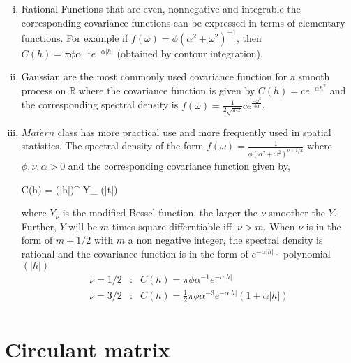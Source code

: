 \begin{enumerate}[(i)]
	\item Rational Functions that are even,  nonnegative and integrable the corresponding covariance functions can be expressed in terms of elementary functions. For example if $f(\omega) =\phi (\alpha^2+\omega^2)^{-1}$, then $C(h) = \pi\phi\alpha^{-1}e^{-\alpha|h|}$ (obtained by contour integration).
	      
	\item Gaussian are the most commonly used covariance function for a smooth process on $\mathbb{R}$ where the covariance function is given by $C(h)=ce^{-\alpha h^2}$ and the corresponding spectral density is $ f(\omega) = \frac{1}{2\sqrt{\pi\alpha}}c e^{\frac{-\omega^2}{4\alpha}}$.
	      
	\item $Mat\acute{e}rn$ class has more practical use and more frequently used in spatial statistics. The spectral density of the form $f(\omega) =\frac{1}{\phi(\alpha^2+\omega^2)^{\nu+1/2}}$ where $\phi,\nu,\alpha>0$ and the corresponding covariance function given by,
	      
	      \beq
	      C(h) =  (\alpha|h|)^{\nu} Y_{\nu} (\alpha|t|)
	      \eeq
	      
	      where $Y_{\nu}$ is the modified Bessel function, the larger the $\nu$ smoother the $Y$. Further, $Y$ will be $m$ times square differntiable iff $\ \nu>m$. When $\nu$ is in the form of $m+1/2$ with $m$ a non negative integer, the spectral density is rational and the covariance function is in the form of $e^{-\alpha|h|}\cdot$ polynomial$(|h|)$ \\
	      
	      \begin{eqnarray*}
	      	\nu = 1/2 &:& C(h) = \pi\phi\alpha^{-1}e^{-\alpha|h|}\\
	      	\nu = 3/2 &:& C(h) = \frac{1}{2}\pi\phi\alpha^{-3}e^{-\alpha|h|}(1+\alpha|h|)\\
	      \end{eqnarray*}
	      
\end{enumerate}


\section{Circulant matrix}

